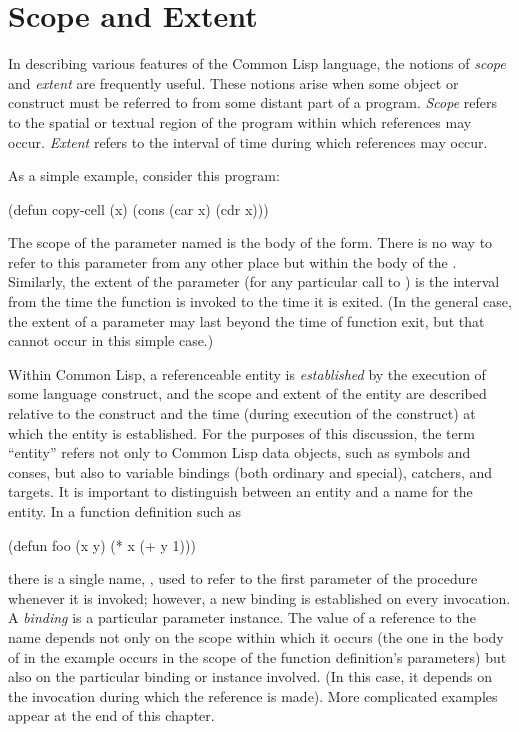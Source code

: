 
\clearpage\def\pagestatus{FINAL PROOF}

\chapter{Scope and Extent}
\label{SCOPE}

In describing various features of the Common Lisp language, the notions of
{\it scope} and {\it extent} are frequently useful.  These notions arise when
some object or construct must be referred to from some distant part of a
program.  {\it Scope} refers to the spatial or textual region of the
program within which references may occur.  {\it Extent} refers to the
interval of time during which references may occur.

As a simple example, consider this program:
\begin{lisp}
(defun copy-cell (x) (cons (car x) (cdr x)))
\end{lisp}
The scope of the parameter named  is the body of the  form.
There is no way to refer to this parameter from any other place but within
the body of the .  Similarly, the extent of the parameter 
(for any particular call to ) is the interval from the time
the function is invoked to the time it is exited.  (In the general case,
the extent of a parameter may last beyond the time of function exit,
but that cannot occur in this simple case.)

Within Common Lisp, a referenceable entity is {\it established} by the execution
of some language construct, and the scope and extent of the entity are
described relative to the construct and the time (during execution of the
construct) at which the entity is established.
For the purposes of this discussion, the term ``entity'' refers not only
to Common Lisp data objects, such as symbols and conses, but also to
variable bindings (both ordinary and special), catchers,
and  targets.  It is important to distinguish between
an entity and a name for the entity.  In a function definition
such as
\begin{lisp}
(defun foo (x y) (* x (+ y 1)))
\end{lisp}
there is a single name, , used to refer to the first parameter
of the procedure whenever it is invoked; however, a new binding
is established on every invocation.  A {\it binding} is a particular
parameter instance.  The value of a reference to the name 
depends not only on the scope within which it occurs (the one in
the body of  in the example occurs in the scope of the
function definition's parameters) but also on the particular
binding or instance involved.  (In this case, it depends on the
invocation during which
the reference is made).  More complicated examples
appear at the end of this chapter.

